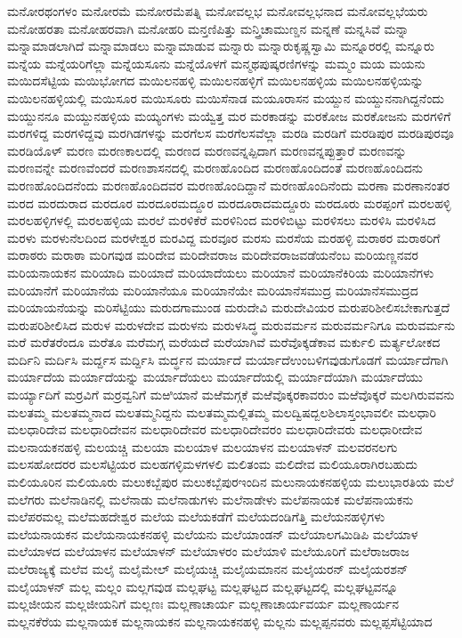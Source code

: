{ಮನೋರಥಂಗಳಂ
ಮನೋರಮೆ
ಮನೋರಮೆಪತ್ನಿ
ಮನೋವಲ್ಲಭ
ಮನೋವಲ್ಲಭನಾದ
ಮನೋವಲ್ಲಭೆಯರು
ಮನೋಹರತಾ
ಮನೋಹರವಾಗಿ
ಮನೋಹರಿ
ಮನ್ತಣಿಪಿತ್ತು
ಮನ್ತ್ರಿಚಾಮುಣ್ಡನ
ಮನ್ನಣೆ
ಮನ್ನಸಿವೆ
ಮನ್ನಾ
ಮನ್ನಾಮಾಡಲಾಗಿದೆ
ಮನ್ನಾಮಾಡಲು
ಮನ್ನಾಮಾಡುವ
ಮನ್ನಾರು
ಮನ್ನಾರುಕೃಷ್ಣಸ್ವಾಮಿ
ಮನ್ನೂರರಲ್ಲಿ
ಮನ್ನೂರು
ಮನ್ನೆಯ
ಮನ್ನೆಯರಿಗೆಲ್ಲಾ
ಮನ್ನೆಯಸೂನು
ಮನ್ನೆಯೊಳಗೆ
ಮನ್ಮಥಪುಷ್ಕರಣಿಗಳನ್ನು
ಮಮ್ಮಂ
ಮಯ
ಮಯನು
ಮಯಿದಸೆಟ್ಟಿಯ
ಮಯಿಭೋಗದ
ಮಯಿಲನಹಳ್ಳಿ
ಮಯಿಲನಹಳ್ಳಿಗೆ
ಮಯಿಲನಹಳ್ಳಿಯ
ಮಯಿಲನಹಳ್ಳಿಯನ್ನು
ಮಯಿಲನಹಳ್ಳಿಯಲ್ಲಿ
ಮಯಿಸೂರ
ಮಯಿಸೂರು
ಮಯಿಸೆನಾಡ
ಮಯೂರಾಸನ
ಮಯ್ದುನ
ಮಯ್ದುನನಾಗಿದ್ದನೆಂದು
ಮಯ್ದುನನೂ
ಮಯ್ದುನಹಳ್ಳಿಯ
ಮಯ್ಯಂಗಳು
ಮಯ್ವೆತ್ತ
ಮರ
ಮರಕಾಡನ್ನು
ಮರಕೋಜ
ಮರಕೋಜನು
ಮರಗಳಿಗೆ
ಮರಗಳಿದ್ದ
ಮರಗಳಿದ್ದವು
ಮರಗಿಡಗಳನ್ನು
ಮರಗೆಲಸ
ಮರಗೆಲಸವೆಲ್ಲಾ
ಮರಡಿ
ಮರಡಿಗೆ
ಮರಡಿಪುರ
ಮರಡಿಪುರವೂ
ಮರಡಿಯೊಳ್
ಮರಣ
ಮರಣಕಾಲದಲ್ಲಿ
ಮರಣದ
ಮರಣವನ್ನಪ್ಪಿದಾಗ
ಮರಣವನ್ನಪ್ಪುತ್ತಾರೆ
ಮರಣವನ್ನು
ಮರಣವನ್ನೇ
ಮರಣವೆಂದರೆ
ಮರಣಶಾಸನದಲ್ಲಿ
ಮರಣಹೊಂದಿದ
ಮರಣಹೊಂದಿದಂತೆ
ಮರಣಹೊಂದಿದನು
ಮರಣಹೊಂದಿದನೆಂದು
ಮರಣಹೊಂದಿದವರ
ಮರಣಹೊಂದಿದ್ದಾನೆ
ಮರಣಹೊಂದಿನೆಂದು
ಮರಣಾ
ಮರಣಾನಂತರ
ಮರದ
ಮರದುರಾದ
ಮರದೂರ
ಮರದೂರಮದ್ದೂರ
ಮರದೂರಾದಮದ್ದೂರು
ಮರದೂರು
ಮರಪ್ಪಂಗೆ
ಮರಲಹಳ್ಳಿ
ಮರಲಹಳ್ಳಿಗಳಲ್ಲಿ
ಮರಲಹಳ್ಳಿಯ
ಮರಲೆ
ಮರಳಿಕೆರೆ
ಮರಳಿನಿಂದ
ಮರಳಿಬಿಟ್ಟು
ಮರಳಿಸಲು
ಮರಳಿಸಿ
ಮರಳಿಸಿದ
ಮರಳು
ಮರಳುನೆಲದಿಂದ
ಮರಳೇಶ್ವರ
ಮರವಿದ್ದ
ಮರವೂರ
ಮರಸು
ಮರಸೆಯ
ಮರಹಳ್ಳಿ
ಮರಾಠರ
ಮರಾಠರಿಗೆ
ಮರಾಠರು
ಮರಾಠಾ
ಮರಿಗವುಡ
ಮರಿದೇವ
ಮರಿದೇವರಾಜ
ಮರಿದೇವರಾಜವಡೆಯನೆಂಬ
ಮರಿಯಣ್ಣನವರ
ಮರಿಯನಾಯಕನ
ಮರಿಯಾದಿ
ಮರಿಯಾದೆ
ಮರಿಯಾದೆಯಲು
ಮರಿಯಾನೆ
ಮರಿಯಾನೆಕಿರಿಯ
ಮರಿಯಾನೆಗಳು
ಮರಿಯಾನೆಗೆ
ಮರಿಯಾನೆಯ
ಮರಿಯಾನೆಯೂ
ಮರಿಯಾನೆಯೇ
ಮರಿಯಾನೆಸಮುದ್ರ
ಮರಿಯಾನೆಸಮುದ್ರದ
ಮರಿಯಾಯನೆಯನ್ನು
ಮರಿಸೆಟ್ಟಿಯು
ಮರುದಗಾಮುಂಡ
ಮರುದೇವಿ
ಮರುದೇವಿಯರ
ಮರುಪರಿಶೀಲಿಸಬೇಕಾಗುತ್ತದೆ
ಮರುಪರಿಶೀಲಿಸಿದ
ಮರುಳ
ಮರುಳದೇವ
ಮರುಳನು
ಮರುಳಸಿದ್ಧ
ಮರುವರ್ಮನ
ಮರುವರ್ಮನಿಗೂ
ಮರುವರ್ಮನು
ಮರೆ
ಮರೆತರೆಂದೂ
ಮರೆತೂ
ಮರೆಮಗ್ಗ
ಮರೆಯದೆ
ಮರೆಯಾಗಿವೆ
ಮರೆವೊಕ್ಕಡೆಕಾವ
ಮರ್ಕುಲಿ
ಮರ್ತ್ಯಲೋಕದ
ಮರ್ದಿನಿ
ಮರ್ದಿಸಿ
ಮರ್ದ್ದಸ
ಮರ್ದ್ದಿಸಿ
ಮರ್ದ್ಧನ
ಮರ್ಯಾದೆ
ಮರ್ಯಾದೆಉಂಬಳಿಗವುಡುಗೊಡಗೆ
ಮರ್ಯಾದೆಗಾಗಿ
ಮರ್ಯಾದೆಯ
ಮರ್ಯಾದೆಯನ್ನು
ಮರ್ಯಾದೆಯಲು
ಮರ್ಯಾದೆಯಲ್ಲಿ
ಮರ್ಯಾದೆಯಾಗಿ
ಮರ್ಯಾದೆಯು
ಮರ್ಯ್ಯಾದಿಗೆ
ಮರ್ರವಿಗೆ
ಮರ್ರವ್ವನಿಗೆ
ಮಱಿಯಾನೆ
ಮಱೆಮಗ್ಗಕೆ
ಮಱೆವೊಕ್ಕರಕಾವರುಂ
ಮಱೆವೊಕ್ಕರೆ
ಮಲಗಿರುವವನು
ಮಲತಮ್ಮ
ಮಲತಮ್ಮನಾದ
ಮಲತಮ್ಮನಿದ್ದನು
ಮಲತಮ್ಮಮಲ್ಲಿತಮ್ಮ
ಮಲದ್ವಿಷದ್ಬಲಶಿಲಾಸ್ತಂಭಾವಲೀ
ಮಲಧಾರಿ
ಮಲಧಾರಿದೇವ
ಮಲಧಾರಿದೇವನ
ಮಲಧಾರಿದೇವರ
ಮಲಧಾರಿದೇವರಂ
ಮಲಧಾರಿದೇವರು
ಮಲಧಾರೀದೇವ
ಮಲನಾಯಕನಹಳ್ಳಿ
ಮಲಯಚ್ಚಿ
ಮಲಯಾ
ಮಲಯಾಳ
ಮಲಯಾಳನ
ಮಲಯಾಳನ್
ಮಲವರನಲಗು
ಮಲಸಹೋದರರ
ಮಲಸೆಟ್ಟಿಯರ
ಮಲಹಗಳ್ಳಿಮಳಗಳಲಿ
ಮಲಿತಂಮ
ಮಲಿದೇವ
ಮಲಿಯೂರಾಗಿರಬಹುದು
ಮಲಿಯೂರಿನ
ಮಲಿಯೂರು
ಮಲುಕಬ್ಬೆಪುರ
ಮಲುಕಬ್ಬೆಪುರಇಂದಿನ
ಮಲುನಾಯಕನಹಳ್ಳಿಯ
ಮಲುಭಾರತಿಯ
ಮಲೆ
ಮಲೆಗರು
ಮಲೆನಾಡಿನಲ್ಲಿ
ಮಲೆನಾಡು
ಮಲೆನಾಡುಗಳು
ಮಲೆನಾಡೇಳು
ಮಲೆಪನಾಯಕ
ಮಲೆಪನಾಯಕನು
ಮಲೆಪರಮಲ್ಲ
ಮಲೆಮಹದೇಶ್ವರ
ಮಲೆಯ
ಮಲೆಯಕಡೆಗೆ
ಮಲೆಯದಂಡಿಗೆತ್ತಿ
ಮಲೆಯನಹಳ್ಳಿಗಳು
ಮಲೆಯನಾಯಕನ
ಮಲೆಯನಾಯಕನಹಳ್ಳಿ
ಮಲೆಯನು
ಮಲೆಯಾಂಡನ್
ಮಲೆಯಾಲಗಮಿಡಿಪಿ
ಮಲೆಯಾಳ
ಮಲೆಯಾಳದ
ಮಲೆಯಾಳನ
ಮಲೆಯಾಳನ್
ಮಲೆಯಾಳರಂ
ಮಲೆಯಾಳಿ
ಮಲೆಯೂರಿಗೆ
ಮಲೆರಾಜರಾಜ
ಮಲೆರಾಜ್ಯಕ್ಕೆ
ಮಲೆವ
ಮಲೈ
ಮಲೈಮೇಲ್
ಮಲೈಯಚ್ಚಿ
ಮಲೈಯಮಾನನ
ಮಲೈಯರನ್
ಮಲೈಯರಶನ್
ಮಲೈಯಾಳನ್
ಮಲ್ಲ
ಮಲ್ಲಂ
ಮಲ್ಲಗವುಡ
ಮಲ್ಲಘಟ್ಟ
ಮಲ್ಲಘಟ್ಟದ
ಮಲ್ಲಘಟ್ಟದಲ್ಲಿ
ಮಲ್ಲಘಟ್ಟವನ್ನೂ
ಮಲ್ಲಜೀಯನ
ಮಲ್ಲಜೀಯನಿಗೆ
ಮಲ್ಲಣಃ
ಮಲ್ಲಣಾಚಾರ್ಯ
ಮಲ್ಲಣಾಚಾರ್ಯವರ್ಯ
ಮಲ್ಲಣಾರ್ಯನ
ಮಲ್ಲನಕೆರೆಯ
ಮಲ್ಲನಾಯಕ
ಮಲ್ಲನಾಯಕನ
ಮಲ್ಲನಾಯಕನಹಳ್ಳಿ
ಮಲ್ಲನು
ಮಲ್ಲಪ್ಪನವರು
ಮಲ್ಲಪ್ಪಸೆಟ್ಟಿಯಾದ
}
